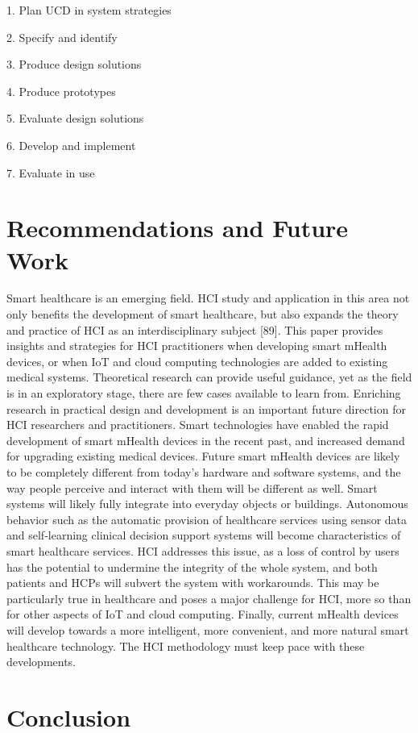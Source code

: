 \documentclass[letterpaper,12pt]{article}
\begin{document}
1. Plan UCD in system strategies

2. Specify and identify

3. Produce design solutions

4. Produce prototypes

5. Evaluate design solutions

6. Develop and implement 

7. Evaluate in use

\section{Recommendations and Future Work}

Smart healthcare is an emerging field. HCI study and application in this area not only benefits the development of smart
healthcare, but also expands the theory and practice of HCI as an interdisciplinary subject [89]. This paper provides insights and
strategies for HCI practitioners when developing smart mHealth devices, or when IoT and cloud computing technologies are
added to existing medical systems. Theoretical research can provide useful guidance, yet as the field is in an exploratory stage,
there are few cases available to learn from. Enriching research in practical design and development is an important future
direction for HCI researchers and practitioners.
Smart technologies have enabled the rapid development of smart mHealth devices in the recent past, and increased demand
for upgrading existing medical devices. Future smart mHealth devices are likely to be completely different from today’s
hardware and software systems, and the way people perceive and interact with them will be different as well. Smart systems
will likely fully integrate into everyday objects or buildings. Autonomous behavior such as the automatic provision of
healthcare services using sensor data and self-learning clinical decision support systems will become characteristics of smart
healthcare services. HCI addresses this issue, as a loss of control by users has the potential to undermine the integrity of the
whole system, and both patients and HCPs will subvert the system with workarounds. This may be particularly true in
healthcare and poses a major challenge for HCI, more so than for other aspects of IoT and cloud computing.
Finally, current mHealth devices will develop towards a more intelligent, more convenient, and more natural smart
healthcare technology. The HCI methodology must keep pace with these developments.

\section{Conclusion}
\end{document}
